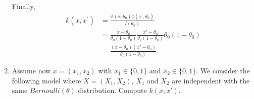 \documentclass{article}[12pt]
\begin{document}
\begin{enumerate}
Finally, 
\begin{equation}
\begin{aligned}
k\left(x, x^{\prime}\right)&=\frac{\phi\left(x, \theta_{0}\right) \phi\left(x^{\prime}, \theta_{0}\right)}{I\left(\theta_{0}\right)} \\
&= \frac{x-\theta_0}{\theta_0 (1-\theta_0)} \frac{x'-\theta_0}{\theta_0 (1-\theta_0)} \theta_0 (1-\theta_0) \\
&= \frac{\left( x-\theta_0\right) \left( x'-\theta_0\right)}{\theta_0 (1-\theta_0)}.
\end{aligned}
\end{equation}

\item
Assume now $x=(x_1,x_2)$ with $x_1 \in \{0,1\}$ and $x_2 \in \{0,1\}$. 
We consider the following model where $X=(X_1,X_2)$, $X_1$ and $X_2$ are independent with the same $Bernoulli(\theta)$ distribution. 
Compute $k(x,x')$. 
\end{enumerate}
 
\end{document}

